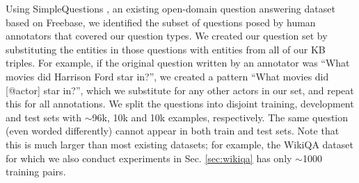 Using SimpleQuestions \citep{bordes2015large},
an existing open-domain question answering dataset based on Freebase,
we identified the subset of questions posed by human annotators that covered
our question types.
We created our question set by substituting the entities in those questions
with entities from all of our KB triples.
%
For example, if the original question written by an annotator was
``What movies did Harrison Ford star in?'', we created a pattern
``What movies did [@actor] star in?'', which we substitute for any
other actors in our set, and repeat this for all annotations.
We split the questions into disjoint training, development and test sets
with $\sim$96k, 10k and 10k examples, respectively.
The same question (even worded differently) cannot appear in
both train and test sets.
Note that this is much larger than most existing datasets;
for example, the {\sc WikiQA} dataset \citep{yang2015wikiqa}
for which we also conduct experiments
in Sec. \ref{sec:wikiqa} has only $\sim$1000 training pairs.
